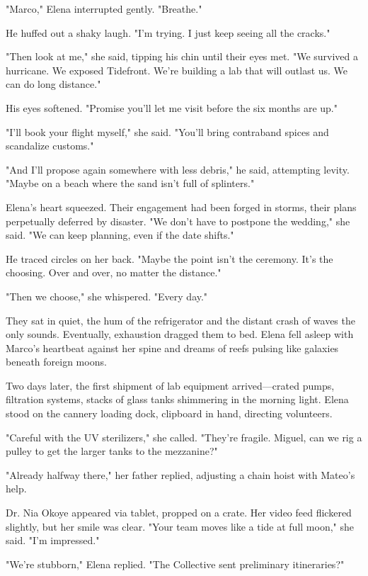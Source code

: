 "Marco," Elena interrupted gently. "Breathe."

He huffed out a shaky laugh. "I'm trying. I just keep seeing all the cracks."

"Then look at me," she said, tipping his chin until their eyes met. "We survived a hurricane. We exposed Tidefront. We're building a lab that will outlast us. We can do long distance."

His eyes softened. "Promise you'll let me visit before the six months are up."

"I'll book your flight myself," she said. "You'll bring contraband spices and scandalize customs."

"And I'll propose again somewhere with less debris," he said, attempting levity. "Maybe on a beach where the sand isn't full of splinters."

Elena's heart squeezed. Their engagement had been forged in storms, their plans perpetually deferred by disaster. "We don't have to postpone the wedding," she said. "We can keep planning, even if the date shifts."

He traced circles on her back. "Maybe the point isn't the ceremony. It's the choosing. Over and over, no matter the distance."

"Then we choose," she whispered. "Every day."

They sat in quiet, the hum of the refrigerator and the distant crash of waves the only sounds. Eventually, exhaustion dragged them to bed. Elena fell asleep with Marco's heartbeat against her spine and dreams of reefs pulsing like galaxies beneath foreign moons.

\bigskip

Two days later, the first shipment of lab equipment arrived—crated pumps, filtration systems, stacks of glass tanks shimmering in the morning light. Elena stood on the cannery loading dock, clipboard in hand, directing volunteers.

"Careful with the UV sterilizers," she called. "They're fragile. Miguel, can we rig a pulley to get the larger tanks to the mezzanine?"

"Already halfway there," her father replied, adjusting a chain hoist with Mateo's help.

Dr. Nia Okoye appeared via tablet, propped on a crate. Her video feed flickered slightly, but her smile was clear. "Your team moves like a tide at full moon," she said. "I'm impressed."

"We're stubborn," Elena replied. "The Collective sent preliminary itineraries?"

